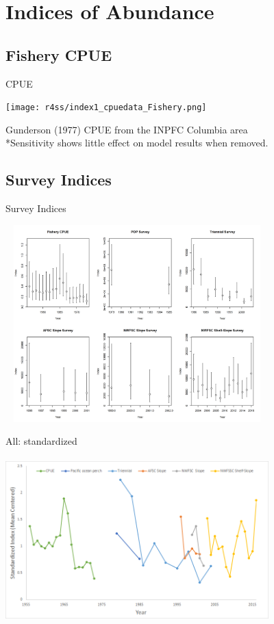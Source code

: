 \documentclass[pdf]{beamer}\usepackage[]{graphicx}\usepackage[]{color}
\begin{document}
\section{Indices of Abundance}
\subsection{Fishery CPUE}
\begin{frame}{CPUE}
  \begin{center}
      \texttt{[image: r4ss/index1\_cpuedata\_Fishery.png]}
  \end{center}
  Gunderson (1977) CPUE from the INPFC Columbia area\\
  *Sensitivity shows little effect on model results when removed.
\end{frame}

\subsection{Survey Indices}
\begin{frame}{Survey Indices}
  \begin{center}
  \includegraphics[height = 3in, width = 4in]{figures/Index_Data.png}
  \end{center}
\end{frame}

\begin{frame}{All: standardized}
  \begin{center}
  \includegraphics[height = 2.5in, width = 4in]{figures/standardized_index.png}
  \end{center}
\end{frame}
\end{document}
